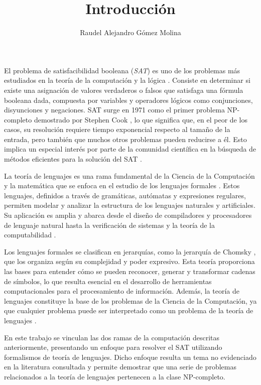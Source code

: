 \documentclass[12pt]{article}
\title{Introducción}
\author{Raudel Alejandro Gómez Molina}
\begin{document}
\maketitle

El problema de satisfacibilidad booleana (\textit{SAT}) \cite{authomataTheory} es uno de los problemas más estudiados en 
la teoría de la computación y la lógica \cite{biere2021handbook}.  Consiste en determinar si existe una asignación 
de valores verdaderos o falsos que satisfaga una fórmula booleana dada, compuesta por variables y operadores 
lógicos como conjunciones, disyunciones y negaciones. SAT surge en 1971 como el primer problema NP-completo 
demostrado por Stephen Cook \cite{Cook1971}, lo que significa que, en el peor de los casos, su resolución 
requiere tiempo exponencial respecto al tamaño de la entrada, pero también que muchos otros problemas pueden 
reducirse a él. Esto implica un especial interés por parte de la comunidad científica en la búsqueda de 
métodos eficientes para la solución del SAT \cite{biere2021handbook}.

La teoría de lenguajes es una rama fundamental de la Ciencia de la Computación y la matemática que se enfoca 
en el estudio de los lenguajes formales \cite{authomataTheory}. Estos lenguajes, definidos a través de 
gramáticas, autómatas y expresiones regulares, permiten modelar y analizar la estructura de los lenguajes 
naturales y artificiales. Su aplicación es amplia y abarca desde el diseño de compiladores y procesadores de 
lenguaje natural hasta la verificación de sistemas y la teoría de la computabilidad \cite{authomataTheory}.

Los lenguajes formales se clasifican en jerarquías, como la jerarquía de Chomsky \cite{hunter2020chomsky}, 
que los organiza según su complejidad y poder expresivo. Esta teoría proporciona las bases para 
entender cómo se pueden reconocer, generar y transformar cadenas de símbolos, lo que resulta esencial 
en el desarrollo de herramientas computacionales para el procesamiento de información. Además, 
la teoría de lenguajes constituye la base de los problemas de la Ciencia de la Computación, ya que 
cualquier problema puede ser interpretado como un problema de la teoría de lenguajes \cite{authomataTheory}.

En este trabajo se vinculan las dos ramas de la computación descritas anteriormente, presentando 
un enfoque para resolver el SAT utilizando formalismos de teoría de lenguajes. Dicho enfoque resulta un 
tema no evidenciado en la literatura consultada y permite demostrar que una serie de problemas 
relacionados a la teoría de lenguajes pertenecen a la clase NP-completo.
\end{document}
